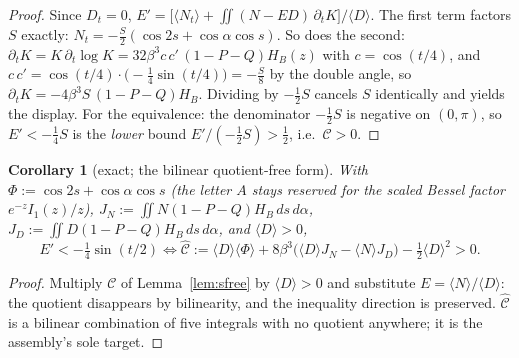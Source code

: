 \documentclass[11pt]{article}
\newtheorem{corollary}[theorem]{Corollary}
\theoremstyle{remark}
\begin{document}
\begin{proof}
Since $D_t=0$,
$E'=\bigl[\langle N_t\rangle+\iint (N-E D)\,\partial_tK\bigr]/
\langle D\rangle$. The first term factors $S$ exactly:
$N_t=-\tfrac{S}{2}(\cos 2s+\cos\alpha\cos s)$. So does the second:
$\partial_tK=K\,\partial_t\!\log K=32\beta^3 c\,c'\,(1-P-Q)H_B(z)$ with
$c=\cos(t/4)$, and
$c\,c'=\cos(t/4)\cdot\bigl(-\tfrac14\sin(t/4)\bigr)=-\tfrac{S}{8}$
by the double angle, so $\partial_tK=-4\beta^3S\,(1-P-Q)H_B$. Dividing
by $-\tfrac12 S$ cancels $S$ identically and yields the display. For
the equivalence: the denominator $-\tfrac12 S$ is negative on
$(0,\pi)$, so $E'<-\tfrac14 S$ is the \emph{lower} bound
$E'/(-\tfrac12 S)>\tfrac12$, i.e.\ $\mathcal C>0$.
\end{proof}

\begin{corollary}[exact; the bilinear quotient-free form]
\label{cor:chat}
With $\Phi:=\cos 2s+\cos\alpha\cos s$ \textup{(}the letter $A$ stays
reserved for the scaled Bessel factor $e^{-z}I_1(z)/z$\textup{)},
$J_N:=\iint N(1-P-Q)H_B\,ds\,d\alpha$,
$J_D:=\iint D(1-P-Q)H_B\,ds\,d\alpha$, and $\langle D\rangle>0$,
\[
E'<-\tfrac14\sin(t/2)
\iff
\widehat{\mathcal C}:=\langle D\rangle\langle \Phi\rangle
+8\beta^3\bigl(\langle D\rangle J_N-\langle N\rangle J_D\bigr)
-\tfrac12\langle D\rangle^2>0 .
\]
\end{corollary}

\begin{proof}
Multiply $\mathcal C$ of Lemma~\ref{lem:sfree} by $\langle D\rangle>0$
and substitute $E=\langle N\rangle/\langle D\rangle$: the quotient
disappears by bilinearity, and the inequality direction is preserved.
$\widehat{\mathcal C}$ is a bilinear combination of five integrals
with no quotient anywhere; it is the assembly's sole target.
\end{proof}
\end{document}
